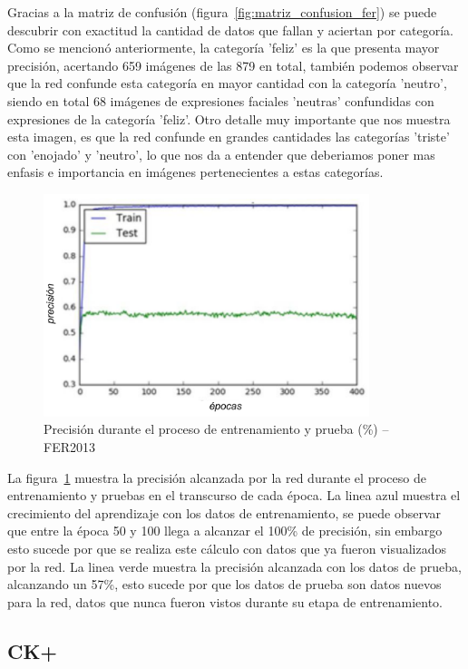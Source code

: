 Gracias a la matriz de confusión (figura~\ref{fig:matriz_confusion_fer}) se puede descubrir con exactitud la cantidad de datos que fallan y aciertan por categoría. Como se mencionó anteriormente, la categoría 'feliz' es la que presenta mayor precisión, acertando 659 imágenes de las 879 en total, también podemos observar que la red confunde esta categoría en mayor cantidad con la categoría 'neutro', siendo en total 68 imágenes de expresiones faciales 'neutras' confundidas con expresiones de la categoría 'feliz'. Otro detalle muy importante que nos muestra esta imagen, es que la red confunde en grandes cantidades las categorías 'triste' con 'enojado' y 'neutro', lo que nos da a entender que deberiamos poner mas enfasis e importancia en imágenes pertenecientes a estas categorías.  
\begin{figure}[H]
		\centering
		\includegraphics[width=95mm]{Imagenes/precision_fer.pdf}
		\caption{Precisión durante el proceso de entrenamiento y prueba (\%) – FER2013}
		\label{fig:precision_fer}
\end{figure}

La figura~\ref{fig:precision_fer} muestra la precisión alcanzada por la red durante el proceso de entrenamiento y pruebas en el transcurso de cada época. La linea azul muestra el crecimiento del aprendizaje con los datos de entrenamiento, se puede observar que entre la época 50 y 100 llega a alcanzar el 100\% de precisión, sin embargo esto sucede por que se realiza este cálculo con datos que ya fueron visualizados por la red. La linea verde muestra la precisión alcanzada con los datos de prueba, alcanzando un 57\%, esto sucede por que los datos de prueba son datos nuevos para la red, datos que nunca fueron vistos durante su etapa de entrenamiento.

 
\subsection{CK+}

